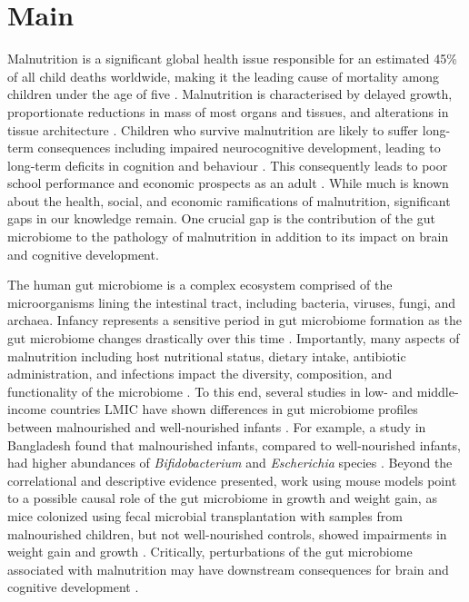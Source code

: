 \documentclass{article}
\begin{document}
\section*{Main}
Malnutrition is a significant global health issue responsible for an estimated 45\% of all child deaths worldwide, making it the leading cause of mortality among children under the age of five \cite{de1997global}.
Malnutrition is characterised by delayed growth, proportionate reductions in mass of most organs and tissues, and alterations in tissue architecture \cite{martorell1984malnutrition}.
Children who survive malnutrition are likely to suffer long-term consequences including impaired neurocognitive development, leading to long-term deficits in cognition and behaviour \cite{nyaradi2013role}.
This consequently leads to poor school performance and economic prospects as an adult \cite{jamison1986child}.
While much is known about the health, social, and economic ramifications of malnutrition, significant gaps in our knowledge remain.
One crucial gap is the contribution of the gut microbiome to the pathology of malnutrition in addition to its impact on brain and cognitive development.

The human gut microbiome is a complex ecosystem comprised of the microorganisms lining the intestinal tract, including bacteria, viruses, fungi, and archaea.
Infancy represents a sensitive period in gut microbiome formation as the gut microbiome changes drastically over this time \cite{vaher2022microbiome, koenig2011succession}.
Importantly, many aspects of malnutrition including host nutritional status, dietary intake, antibiotic administration, and infections impact the diversity, composition, and functionality of the microbiome \cite{morreale2023effects, enav2022developing}.
To this end, several studies in low- and middle- income countries \gls{LMIC} have shown differences in gut microbiome profiles between malnourished and well-nourished infants \cite{robertson2023gut, fontaine2023intersection}.
For example, a study in Bangladesh found that malnourished infants, compared to well-nourished infants, had higher abundances of \textit{Bifidobacterium} and \textit{Escherichia} species \cite{chen2021microbiota}.
Beyond the correlational and descriptive evidence presented, work using mouse models point to a possible causal role of the gut microbiome in growth and weight gain, as mice colonized using fecal microbial transplantation with samples from malnourished children, but not well-nourished controls, showed impairments in weight gain and growth \cite{blanton2016gut}.
Critically, perturbations of the gut microbiome associated with malnutrition may have downstream consequences for brain and cognitive development \cite{kelsey2019primer,kelsey2021gut}.
\end{document}
